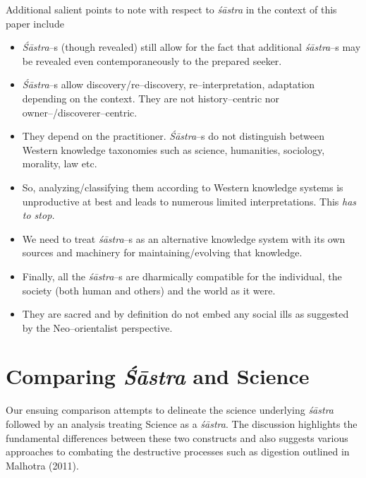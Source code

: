 Additional salient points to note with respect to \textit{śāstra} in the context of this paper include

\begin{itemize}
\item \textit{Śāstra}–s (though revealed) still allow for the fact that additional \textit{śāstra}–s may be revealed even contemporaneously to the prepared seeker.

 \item \textit{Śāstra}–s allow discovery/re–discovery, re–interpretation, adaptation depending on the context. They are not history–centric nor owner–/discoverer–centric. 

 \item They depend on the practitioner. \textit{Śāstra}–s do not distinguish between Western knowledge taxonomies such as science, humanities, sociology, morality, law etc.

 \item So, analyzing/classifying them according to Western knowledge systems is unproductive at best and leads to numerous limited interpretations. This \textit{has to stop.}

 \item We need to treat \textit{śāstra}–s as an alternative knowledge system with its own sources and machinery for maintaining/evolving that knowledge.

 \item Finally, all the \textit{śāstra}–s are dharmically compatible for the individual, the society (both human and others) and the world as it were.

 \item They are sacred and by definition do not embed any social ills as suggested by the Neo–orientalist perspective.

\end{itemize}


\section*{Comparing \textit{Śāstra} and Science}

Our ensuing comparison attempts to delineate the science underlying \textit{śāstra} followed by an analysis treating Science as a \textit{śāstra}. The discussion highlights the fundamental differences between these two constructs and also suggests various approaches to combating the destructive processes such as digestion outlined in Malhotra (2011).



